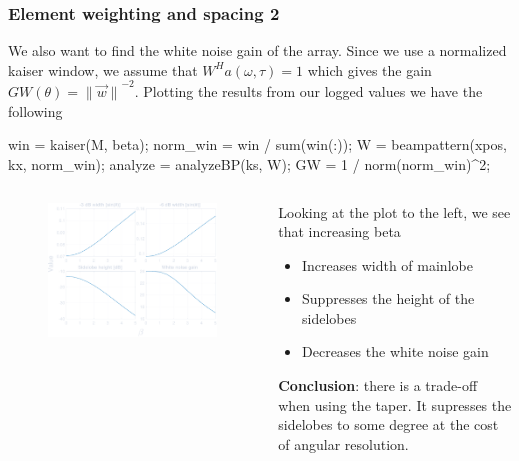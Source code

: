 \documentclass[compress]{beamer}
\newcommand{\norm}[1]{\ensuremath{\lVert#1\rVert}}
\begin{document}
\begin{frame}[fragile] %
    \frametitle{Element weighting and spacing 2}
    We also want to find the white noise gain of the array.
    Since we use a normalized kaiser window, we assume that
    $W^Ha\left(\omega,\tau\right) = 1$ which gives the gain
    $ GW\left(\theta\right)=\norm{\vec{w}}^{-2} $. Plotting the results from
    our logged values we have the following
    \begin{jllisting}[gobble=8,language=Matlab]
        win = kaiser(M, beta); norm_win = win / sum(win(:));
        W = beampattern(xpos, kx, norm_win);
        analyze = analyzeBP(ks, W); GW = 1 / norm(norm_win)^2;
    \end{jllisting}
    \begin{columns}
        \begin{column}{0.5\textwidth}
            \begin{figure}
                \includegraphics[width=\columnwidth]{"../5.pdf"}
            \end{figure}
        \end{column}
        \begin{column}{0.5\textwidth}
            Looking at the plot to the left, we see that increasing beta
            \begin{itemize}
                \item Increases width of mainlobe
                \item Suppresses the height of the sidelobes
                \item Decreases the white noise gain
            \end{itemize}
            {\bf Conclusion}: there is a trade-off when using the taper. It supresses the 
            sidelobes to some degree at the cost of angular resolution.
        \end{column}
    \end{columns}
\end{frame}
\end{document}
